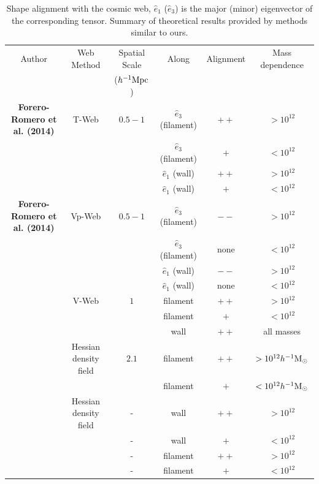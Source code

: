 \documentclass[useAMS,usenatbib]{mn2e}
\newcommand{\hMpc}{{\ifmmode{h^{-1}{\rm Mpc}}\else{$h^{-1}$Mpc }\fi}}
\newcommand{\hMsun}{{\ifmmode{h^{-1}{\rm
        {M_{\odot}}}}\else{$h^{-1}{\rm{M_{\odot}}}$~}\fi}}
\begin{document}
\begin{table}
\begin{tabular}{cccccc}\hline\hline
Author & Web Method & Spatial Scale & Along &
Alignment & Mass dependence\\
 & & ($\hMpc$)& & & \\\hline

{\bf Forero-Romero et al. (2014)} & T-Web & $0.5-1$ &
$\hat{e}_3$ (filament) &$++$ & $>10^{12}$\hMsun\\
&   & &
$\hat{e}_3$ (filament) & $+$ & $<10^{12}$\hMsun\\

&   & &
$\hat{e}_1$ (wall) & $++$ & $>10^{12}$\hMsun\\

&   & &
$\hat{e}_1$ (wall) & $+$ & $<10^{12}$\hMsun\\\hline

{\bf Forero-Romero et al. (2014)} & Vp-Web & $0.5-1$ &
$\hat{e}_3$ (filament) &$--$ & $>10^{12}$\hMsun\\
&   & &
$\hat{e}_3$ (filament) & none & $<10^{12}$\hMsun\\
&   & &
$\hat{e}_1$ (wall) & $--$ & $>10^{12}$\hMsun\\

&   & &
$\hat{e}_1$ (wall) & none & $<10^{12}$\hMsun\\\hline


\cite{Libeskind2013} & V-Web & $1$ &
filament &$++$ & $>10^{12}$\hMsun\\
&   & &
filament &$+$ & $<10^{12}$\hMsun\\
&   & &
wall & $++$ & all masses\\\hline

\cite{Zhang2009}  & Hessian density field &  $2.1$ &
filament & $++$ & $>10^{12}\hMsun$\\

& &  &
filament & $+$ & $<10^{12}\hMsun$\\\hline

\cite{AragonCalvo2007} & Hessian density field & - &
wall & $++$ & $>10^{12}$\hMsun\\

& & - &
wall & $+$ & $<10^{12}$\hMsun\\

& & - &
filament& $++$ & $>10^{12}$\hMsun\\

& & - &
filament& $+$ & $<10^{12}$\hMsun\\\hline \hline

\end{tabular}\\
\caption{Shape alignment with the cosmic web, 
$\hat{e}_1$ ($\hat{e}_3$)
is the major (minor) eigenvector of
the corresponding tensor. 
Summary of theoretical
  results provided by methods similar to ours.}
\end{table}
\end{document}
